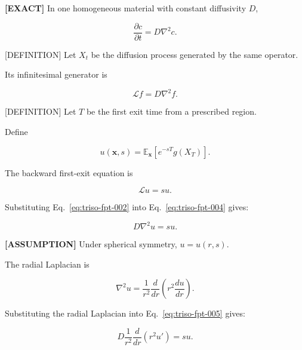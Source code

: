 \documentclass[11pt,a4paper]{article}
\begin{document}
\textbf{[EXACT]} In one homogeneous material with constant diffusivity $D$,

\begin{equation}
\frac{\partial c}{\partial t}=D\nabla^2c.
\tag{TRISO-FPT-001}
\label{eq:triso-fpt-001}
\end{equation}

[DEFINITION] Let $X_t$ be the diffusion process generated by the same operator.

Its infinitesimal generator is

\begin{equation}
\mathcal L f=D\nabla^2f.
\tag{TRISO-FPT-002}
\label{eq:triso-fpt-002}
\end{equation}

[DEFINITION] Let $T$ be the first exit time from a prescribed region.

Define

\begin{equation}
u(\mathbf x,s)
=
\mathbb E_{\mathbf x}\left[e^{-sT}g(X_T)\right].
\tag{TRISO-FPT-003}
\label{eq:triso-fpt-003}
\end{equation}

The backward first-exit equation is

\begin{equation}
\mathcal Lu=su.
\tag{TRISO-FPT-004}
\label{eq:triso-fpt-004}
\end{equation}

Substituting Eq.~\eqref{eq:triso-fpt-002} into Eq.~\eqref{eq:triso-fpt-004} gives:

\begin{equation}
D\nabla^2u=su.
\tag{TRISO-FPT-005}
\label{eq:triso-fpt-005}
\end{equation}

\textbf{[ASSUMPTION]} Under spherical symmetry, $u=u(r,s)$.

The radial Laplacian is

\begin{equation}
\nabla^2u
=
\frac{1}{r^2}\frac{d}{dr}\left(r^2\frac{du}{dr}\right).
\tag{TRISO-FPT-006}
\label{eq:triso-fpt-006}
\end{equation}

Substituting the radial Laplacian into Eq.~\eqref{eq:triso-fpt-005} gives:

\begin{equation}
D\frac{1}{r^2}\frac{d}{dr}(r^2u')=su.
\tag{TRISO-FPT-007}
\label{eq:triso-fpt-007}
\end{equation}
\end{document}

